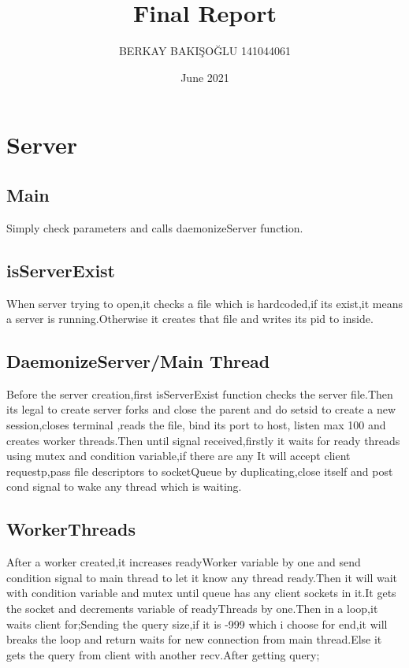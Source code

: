 \documentclass{article}
\title{Final Report}
\author{BERKAY BAKIŞOĞLU 141044061 }
\date{June 2021}
\begin{document}
\maketitle

\section{Server}
\subsection{Main}

Simply check parameters and calls daemonizeServer function.
\subsection{isServerExist}
When server trying to open,it checks a file which is hardcoded,if its exist,it means a server is running.Otherwise it creates that file and writes its pid to inside.

\subsection{DaemonizeServer/Main Thread}
Before the server creation,first isServerExist function checks the server file.Then its legal to create server forks and close the parent and do setsid to create a new session,closes terminal ,reads the file, bind its port to host, listen max 100 and creates worker threads.Then until signal received,firstly it waits for ready threads using mutex and condition variable,if there are any It will accept client requestp,pass file descriptors to socketQueue by duplicating,close itself and post cond signal to wake any thread which is waiting.

\subsection{WorkerThreads}
After a worker created,it increases readyWorker variable by one and send condition signal to main thread to let it know any thread ready.Then it will wait with condition variable and mutex until queue has any client sockets in it.It gets the socket and decrements variable of readyThreads by one.Then in a loop,it waits client for;Sending the query size,if it is -999 which i choose for end,it will breaks the loop and return waits for new connection from main thread.Else it gets the query from client with another recv.After getting query;
\end{document}
